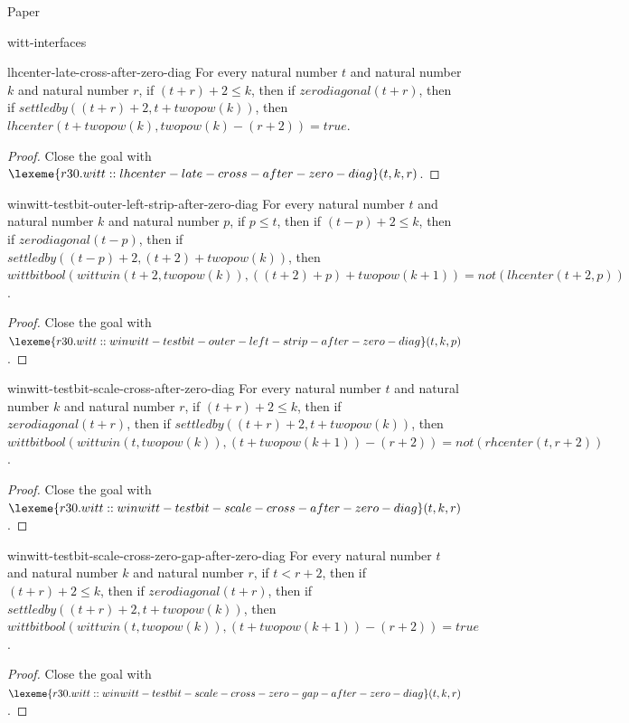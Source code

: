\begin{lexlean}{Paper}
\begin{section}{witt-interfaces}
  \begin{theorem}{lhcenter-late-cross-after-zero-diag}
  For every natural number \(t\) and natural number \(k\) and natural number \(r\), if \((t + r) + 2 ≤ k\), then if \(zerodiagonal(t + r)\), then if \(settledby((t + r) + 2, t + twopow(k))\), then \(lhcenter(t + twopow(k), twopow(k) - (r + 2)) = true\).
  \begin{proof}
  Close the goal with \(\lexeme{r30.witt::lhcenter-late-cross-after-zero-diag}(t, k, r)\).
  \end{proof}
  \end{theorem}

  \begin{theorem}{winwitt-testbit-outer-left-strip-after-zero-diag}
  For every natural number \(t\) and natural number \(k\) and natural number \(p\), if \(p ≤ t\), then if \((t - p) + 2 ≤ k\), then if \(zerodiagonal(t - p)\), then if \(settledby((t - p) + 2, (t + 2) + twopow(k))\), then \(wittbitbool(wittwin(t + 2, twopow(k)), ((t + 2) + p) + twopow(k + 1)) = not(lhcenter(t + 2, p))\).
  \begin{proof}
  Close the goal with \(\lexeme{r30.witt::winwitt-testbit-outer-left-strip-after-zero-diag}(t, k, p)\).
  \end{proof}
  \end{theorem}

  \begin{theorem}{winwitt-testbit-scale-cross-after-zero-diag}
  For every natural number \(t\) and natural number \(k\) and natural number \(r\), if \((t + r) + 2 ≤ k\), then if \(zerodiagonal(t + r)\), then if \(settledby((t + r) + 2, t + twopow(k))\), then \(wittbitbool(wittwin(t, twopow(k)), (t + twopow(k + 1)) - (r + 2)) = not(rhcenter(t, r + 2))\).
  \begin{proof}
  Close the goal with \(\lexeme{r30.witt::winwitt-testbit-scale-cross-after-zero-diag}(t, k, r)\).
  \end{proof}
  \end{theorem}

  \begin{theorem}{winwitt-testbit-scale-cross-zero-gap-after-zero-diag}
  For every natural number \(t\) and natural number \(k\) and natural number \(r\), if \(t < r + 2\), then if \((t + r) + 2 ≤ k\), then if \(zerodiagonal(t + r)\), then if \(settledby((t + r) + 2, t + twopow(k))\), then \(wittbitbool(wittwin(t, twopow(k)), (t + twopow(k + 1)) - (r + 2)) = true\).
  \begin{proof}
  Close the goal with \(\lexeme{r30.witt::winwitt-testbit-scale-cross-zero-gap-after-zero-diag}(t, k, r)\).
  \end{proof}
  \end{theorem}


\end{section}
\end{lexlean}
